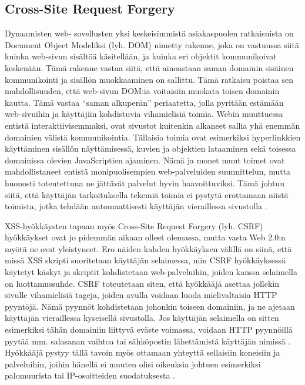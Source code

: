\subsection{Cross-Site Request Forgery}

Dynaamisten web- sovellusten yksi keskeisimmistä asiakaspuolen ratkaisuista on Document Object Modeliksi (lyh. DOM) nimetty rakenne, joka on vastuussa siitä
kuinka web-sivun sisältöä käsitellään, ja kuinka eri objektit kommunikoivat keskenään. Tämä rakenne vastaa siitä, että ainoastaan saman domainin 
sisäinen kommunikointi ja sisällön muokkaaminen on sallittu. Tämä ratkaisu poistaa sen mahdollisuuden, että web-sivun DOM:ia voitaisiin muokata toisen
domainin kautta. Tämä vastaa ``saman alkuperän'' periaatetta, jolla pyritään estämään web-sivuihin ja käyttäjiin kohdistuvia vihamielisiä toimia.
Webin muuttuessa entistä interaktiivisemmaksi, ovat sivustot kuitenkin alkaneet sallia yhä enemmän domainien välistä kommunikointia. Tällaisia 
toimia ovat esimerkiksi hyperlinkkien käyttäminen sisällön näyttämisessä, kuvien ja objektien lataaminen sekä toisessa domainissa olevien 
JavaScriptien ajaminen. Nämä ja monet muut toimet ovat mahdollistaneet entistä monipuolisempien web-palveluiden suunnittelun, mutta huonosti toteutettuna 
ne jättävät palvelut hyvin haavoittuviksi. Tämä johtuu siitä, että käyttäjän tarkoituksella tekemiä toimia ei pystytä erottamaan niistä toimista, jotka tehdään 
automaattisesti käyttäjän vieraillessa sivustolla \cite{WEB2}.

XSS-hyökkäysten tapaan myös Cross-Site Request Forgery (lyh. CSRF) hyökkäykset ovat jo pidemmän aikaan olleet olemassa, mutta vasta Web 2.0:n myötä ne
ovat yleistyneet. Ero näiden kahden hyökkäyksen välillä on siinä, että missä XSS skripti suoritetaan käyttäjän selaimessa, niin CSRF hyökkäyksessä käytetyt
käskyt ja skriptit kohdistetaan web-palveluihin, joiden kanssa selaimella on luottamussuhde. CSRF toteutetaan siten, että hyökkääjä asettaa jollekin sivulle
vihamielisiä tageja, joiden avulla voidaan luoda mielivaltaisia HTTP pyyntöjä. Nämä pyynnöt kohdistetaan johonkin toiseen domainiin, ja ne ajetaan käyttäjän 
vieraillessa kyseisellä sivustolla. Jos käyttäjän selaimella on sitten esimerkiksi tähän domainiin liittyvä eväste voimassa, voidaan HTTP pyynnöillä pyytää mm.  
salasanan vaihtoa tai sähköpostin lähettämistä käyttäjän nimissä \cite{WEB2b}. Hyökkääjä pystyy tällä tavoin myös ottamaan yhteyttä sellaisiin koneisiin ja palveluihin,
joihin hänellä ei muuten olisi oikeuksia johtuen esimerkiksi palomuurista tai IP-osoitteiden suodatuksesta \cite{CSRF}.

